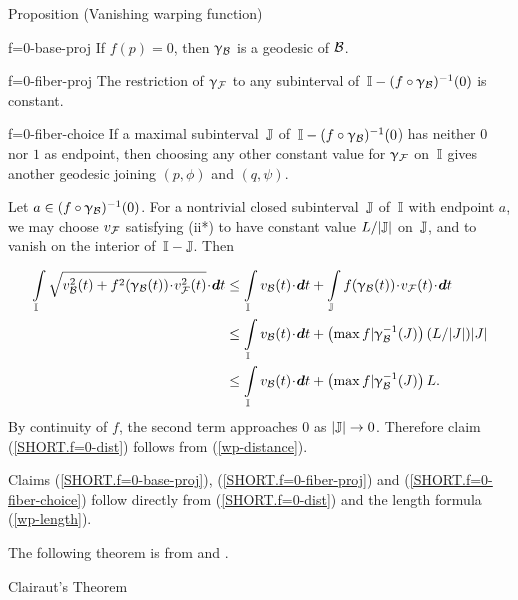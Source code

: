{\begin{thm}{Proposition (Vanishing warping function)}
\begin{subthm}{f=0-base-proj}
If $f(p)= 0$, then $\upgamma_{\mathcal{B}}$  is a geodesic of $\mathcal{B}$.
\end{subthm}

\begin{subthm}{f=0-fiber-proj}
The  restriction of $\upgamma_{\mathcal{F}}$ to any subinterval of $\,\II -(f\circ\gamma_\spc{B})^{-1}(0)$  is constant.
\end{subthm}

\begin{subthm}{f=0-fiber-choice}
If a maximal subinterval $\,\mathbb{J}$ of $\,\II -(f\circ\gamma_\spc{B})^{-1}(0$) has neither $0$ nor $1$ as endpoint, then choosing any other constant value for $\upgamma_{\mathcal{F}}$ on $\,\mathbb{I}$  gives another geodesic joining $(p,\phi)$ and $(q,\psi)$.
\end{subthm}
\end{thm}

Let  $a\in (f\circ\gamma_\spc{B})^{-1}(0)$. For a nontrivial closed subinterval $\,\mathbb{J}$ of $\,\mathbb{I}$ with endpoint $a$, we may choose  $v_{\mathcal{F}}$ satisfying (ii*) to have constant value $L/|\mathbb{J}|$ on $\,\mathbb{J}$,  and to vanish on the interior of $\,\mathbb{I}-\mathbb{J}$.   Then  %

\begin{align*}
\int\limits_\II \sqrt{v_\spc{B}^2(t) + f^2(\gamma_\spc{B}(t))\cdot v_\spc{F}^2(t)} \cdot \d t 
&
\le \int\limits_\II v_\spc{B}(t) \cdot \d t + 
\int\limits_\JJ f(\gamma_\spc{B}(t))\cdot v_\spc{F}(t)\cdot \d t\\
&
\le  \int\limits_\II v_\spc{B}(t) \cdot \d t +\left( \max f|\gamma_\spc{B}^{-1}(J)\right)(L/|J|)|J| \\
&
\le 
\int\limits_\II v_\spc{B}(t) \cdot\d t 
+\left( \max f|\gamma_\spc{B}^{-1}(J)\right)L.
\end{align*}
By continuity of $f$, the second term approaches $0$ as $|\JJ|\to 0$. Therefore claim (\ref{SHORT.f=0-dist}) follows from (\ref{wp-distance}).

Claims (\ref{SHORT.f=0-base-proj}), (\ref{SHORT.f=0-fiber-proj}) and (\ref{SHORT.f=0-fiber-choice}) follow directly from (\ref{SHORT.f=0-dist}) and the length formula (\ref{wp-length}).
\qeds

The following theorem is from \cite{AB3} and \cite{BP}.

\begin{thm}{Clairaut's Theorem}
\label{thm:clairaut} 


\end{thm}}
